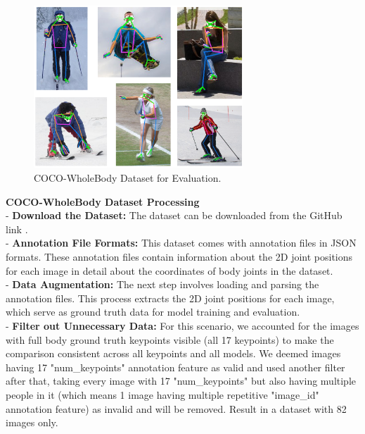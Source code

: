 \documentclass[12pt]{article}
\begin{document}
\begin{figure}[ht]
    \centering
    \includegraphics[width=0.7\textwidth]{coco.jpg}
    \caption{COCO-WholeBody Dataset for Evaluation.}
\end{figure}

\textbf{COCO-WholeBody Dataset Processing}\\[5pt]
\hspace*{1.5em}- \textbf{Download the Dataset:} The dataset can be downloaded from the GitHub link \cite{jin2020github}.\\[5pt]
\hspace*{1.5em}- \textbf{Annotation File Formats:} This dataset comes with annotation files in JSON formats. These annotation files contain information about the 2D joint positions for each image in detail about the coordinates of body joints in the dataset.\\[5pt]
\hspace*{1.5em}- \textbf{Data Augmentation:} The next step involves loading and parsing the annotation files. This process extracts the 2D joint positions for each image, which serve as ground truth data for model training and evaluation.\\[5pt]
\hspace*{1.5em}- \textbf{Filter out Unnecessary Data:} For this scenario, we accounted for the images with full body ground truth keypoints visible (all 17 keypoints) to make the comparison consistent across all keypoints and all models. We deemed images having 17 "num\_keypoints" annotation feature as valid and used another filter after that, taking every image with 17 "num\_keypoints" but also having multiple people in it (which means 1 image having multiple repetitive "image\_id" annotation feature) as invalid and will be removed. Result in a dataset with 82 images only.
\end{document}
